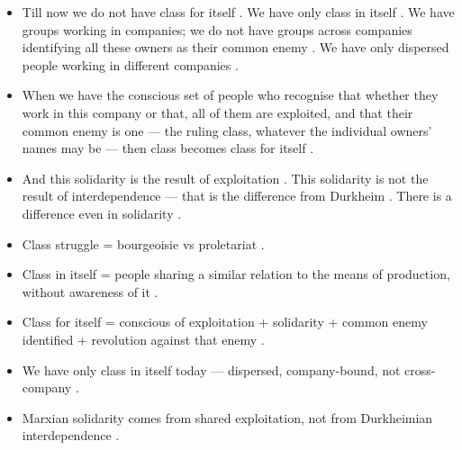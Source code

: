 \begin{itemize}
    \item Till now we do not have class for itself . We have only class in itself . We have groups working in companies; we do not have groups across companies identifying all these owners as their common enemy . We have only dispersed people working in different companies .
    \item When we have the conscious set of people who recognise that whether they work in this company or that, all of them are exploited, and that their common enemy is one --- the ruling class, whatever the individual owners' names may be --- then class becomes class for itself .
    \item And this solidarity is the result of exploitation . This solidarity is not the result of interdependence --- that is the difference from Durkheim . There is a difference even in solidarity .
\end{itemize}

\begin{QuickRevision}
\begin{itemize}
    \item Class struggle = bourgeoisie vs proletariat .
    \item Class in itself = people sharing a similar relation to the means of production, without awareness of it .
    \item Class for itself = conscious of exploitation + solidarity + common enemy identified + revolution against that enemy .
    \item We have only class in itself today --- dispersed, company-bound, not cross-company .
    \item Marxian solidarity comes from shared exploitation, not from Durkheimian interdependence .
\end{itemize}
\end{QuickRevision}

